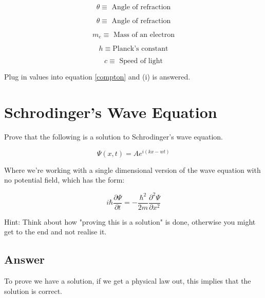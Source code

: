 \documentclass{article}
\begin{document}
\begin{equation}
  \theta \equiv \text{ Angle of refraction}
\end{equation}

\begin{equation}
  \theta \equiv \text{ Angle of refraction}
\end{equation}

\begin{equation}
  m_e \equiv \text{ Mass of an electron}
\end{equation}

\begin{equation}
  h \equiv \text{Planck's constant}
\end{equation}

\begin{equation}
  c \equiv \text{ Speed of light}
\end{equation}

Plug in values into equation \ref{compton} and (i) is answered.  

\clearpage
\section{Schrodinger's Wave Equation}

Prove that the following is a solution to Schrodinger's wave equation. 

\begin{equation}
  \Psi(x,t) = A e^{i(kx-wt)}
\end{equation}

Where we're working with a single dimensional version of the wave equation with 
no potential field, which has the form: 

\begin{equation}
  i \hbar \frac{\partial \Psi}{\partial t} = -\frac{\hbar^2}{2m} 
  \frac{\partial^2 \Psi}{\partial x^2} 
\end{equation}

\vspace{1cm}
Hint: Think about how "proving this is a solution" is done, otherwise you might 
get to the end and not realise it.

\subsection{Answer}

To prove we have a solution, if we get a physical law out, this implies that 
the solution is correct. 
\end{document}
